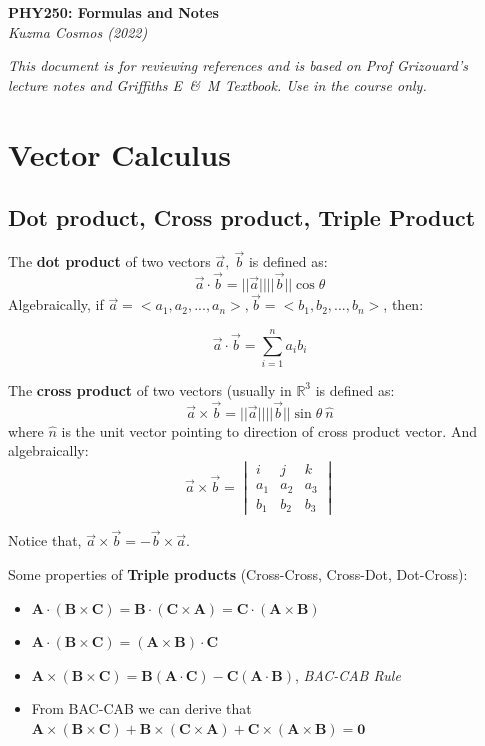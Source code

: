 \documentclass[12pt,a4paper,twoside]{article}
\begin{document}
	\begin{center}
		\textbf{\Large{PHY250: Formulas and Notes}}\\
		\textit{Kuzma Cosmos (2022)}
	\end{center}
	\textit{This document is for reviewing references and is based on Prof Grizouard's lecture notes and Griffiths E\ \&\ M Textbook. Use in the course only.}
	\tableofcontents
	\newpage
	
\section{Vector Calculus}
	\subsection{Dot product, Cross product, Triple Product}
	The \textbf{dot product} of two vectors \(\overrightarrow{a},\ \overrightarrow{b}\) is defined as:
	\begin{equation}
		\overrightarrow{a}\cdot \overrightarrow{b}=||\overrightarrow{a}||||\overrightarrow{b}||\cos\theta
	\end{equation}
	Algebraically, if \(\overrightarrow{a}=<a_1, a_2, ..., a_n>,\overrightarrow{b}=<b_1, b_2,..., b_n>\), then:
	
	\[\overrightarrow{a}\cdot \overrightarrow{b}=\sum_{i=1}^n a_ib_i\]
	
	\noindent The \textbf{cross product} of two vectors (usually in \(\mathbb{R}^3\) is defined as:
	\begin{equation}
		\overrightarrow{a}\times \overrightarrow {b}=||\overrightarrow{a}||||\overrightarrow{b}||\sin\theta\ \hat{n}
	\end{equation}
	where \(\hat{n}\) is the unit vector pointing to direction of cross product vector. And algebraically:
	\[\overrightarrow{a}\times \overrightarrow{b}=\begin{vmatrix} i& j &k \\ a_1 &a_2  &a_3 \\b_1  &b_2  &b_3 \end{vmatrix}\]
	
	\noindent Notice that, \(\overrightarrow{a}\times \overrightarrow{b}=-\overrightarrow{b}\times \overrightarrow{a}\).
	
	\noindent Some properties of \textbf{Triple products} (Cross-Cross, Cross-Dot, Dot-Cross):
	\begin{itemize}
		\item \(\textbf{A}\cdot (\textbf{B}\times \textbf{C})= \textbf{B}\cdot (\textbf{C}\times \textbf{A})=\textbf{C}\cdot (\textbf{A}\times \textbf{B})\)
		\item \(\textbf{A}\cdot(\textbf{B}\times \textbf{C})=(\textbf{A}\times \textbf{B})\cdot \textbf{C}\)
		\item \(\textbf{A}\times(\textbf{B}\times \textbf{C})=\textbf{B}(\textbf{A}\cdot \textbf{C})-\textbf{C}(\textbf{A}\cdot \textbf{B})\), \textit{BAC-CAB Rule}
		\item From BAC-CAB we can derive that \(\textbf{A}\times(\textbf{B}\times \textbf{C})+\textbf{B}\times(\textbf{C}\times \textbf{A})+\textbf{C}\times(\textbf{A}\times \textbf{B})=\textbf{0}\)
	\end{itemize}
\end{document}
